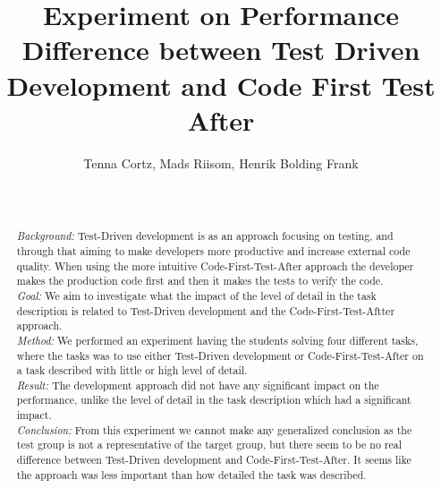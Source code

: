 \documentclass{sig-alternate-05-2015}
\begin{document}
	

\title{Experiment on Performance Difference between Test Driven Development and Code First Test After}

\author{
\alignauthor
Tenna Cortz, Mads Riisom, Henrik Bolding Frank\\
 \\
 \\
}


\maketitle
\begin{abstract}
 \textit{Background:} Test-Driven development is as an approach focusing on testing, and through that aiming to make developers more productive and increase external code quality. When using the more intuitive Code-First-Test-After approach the developer makes the production code first and then it makes the tests to verify the code.\\
[0.0em]
 \textit{Goal:} We aim to investigate what the impact of the level of detail in the task description is related to Test-Driven development and the Code-First-Test-Aftter approach.\\
[0.0em]
 \textit{Method:} We performed an experiment having the students solving four different tasks, where the tasks was to use either Test-Driven development or Code-First-Test-After on a task described with little or high level of detail.\\
[0.0em]
 \textit{Result:} The development approach did not have any significant impact on the performance,  unlike the level of detail in the task description which had a significant impact.\\
[0.0em]
 \textit{Conclusion:} From this experiment we cannot make any generalized conclusion as the test group is not a representative of the target group, but there seem to be no real difference between Test-Driven development and Code-First-Test-After. It seems like the approach was less important than how detailed the task was described.

\end{abstract}
\end{document}
